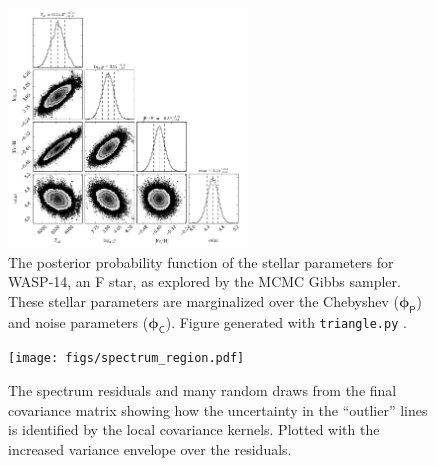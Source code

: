 \documentclass[iop,floatfix]{emulateapj}
\newcommand{\vp}{ {\bm \phi}}
\newcommand{\cheb}{ \vp_{\mathsf{P}}}
\newcommand{\cov}{ \vp_{\mathsf{C}}}
\newcommand{\todo}[1]{ \textcolor{blue}{\\TODO: #1}}
\begin{document}
\begin{figure}[!htb]
\begin{center}
  \includegraphics[draft, width=2.5in]{figs/stellar_triangle_Kurucz.png}
  \caption{The posterior probability function of the stellar parameters for WASP-14, an F star, as explored by the MCMC Gibbs sampler. These stellar parameters are marginalized over the Chebyshev ($\cheb$) and noise parameters ($\cov$). Figure generated with \texttt{triangle.py} \citep{foreman-mackey14}.
}
\label{fig:stellar_posterior}
\end{center}
\end{figure}


\begin{figure}[!htb]
\begin{center}
  \texttt{[image: figs/spectrum\_region.pdf]}
  \caption{The spectrum residuals and many random draws from the final covariance matrix showing how the uncertainty in the ``outlier'' lines is identified by the local covariance kernels. Plotted with the increased variance envelope over the residuals.
}
\label{fig:regions}
\end{center}
\end{figure}

\end{document}
